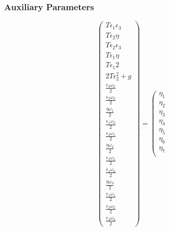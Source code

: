 \documentclass{beamer}
\begin{document}
\begin{frame}
    \frametitle{Auxiliary Parameters}

    \noindent\begin{minipage}{.5\linewidth}
        \begin{equation}
            \left(\begin{array}{c}
                T \epsilon_{1} \epsilon_{3}       \\
                T \epsilon_{2} \eta               \\
                T \epsilon_{2} \epsilon_{3}       \\
                T \epsilon_{1} \eta               \\
                T \epsilon_{1} 2                  \\
                2 T \epsilon_{2}^{2}+g            \\
                \frac{\epsilon_{3} \omega_{2}}{2} \\
                \frac{\epsilon_{2} \omega_{3}}{2} \\
                \frac{\eta \omega_{1}}{2}         \\
                \frac{\epsilon_{1} \omega_{3}}{2} \\
                \frac{\epsilon_{3} \omega_{1}}{2} \\
                \frac{\eta \omega_{2}}{2}         \\
                \frac{\epsilon_{2} \omega_{1}}{2} \\
                \frac{\epsilon_{1} \omega_{2}}{2} \\
                \frac{\eta \omega_{3}}{2}         \\
                \frac{\epsilon_{1} \omega_{1}}{2} \\
                \frac{\epsilon_{2} \omega_{2}}{2} \\
                \frac{\epsilon_{3} \omega_{3}}{2}
            \end{array}\right)=\left(\begin{array}{c}
                \eta_{1}  \\
                \eta_{2}  \\
                \eta_{3}  \\
                \eta_{4}  \\
                \eta_{5}  \\
                \eta_{6}  \\
                \eta_{7}  \\

\end{array}
\end{equation}
\end{minipage}
\end{frame}
\end{document}
